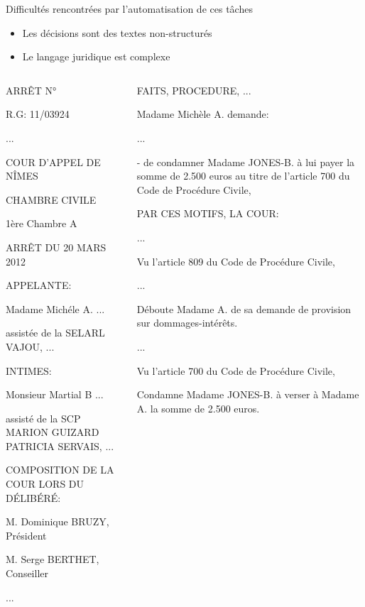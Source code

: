 \begin{frame}{Difficultés rencontrées par l'automatisation de ces tâches}
	\begin{itemize}
		\item Les décisions sont des textes non-structurés
		\item Le langage juridique est complexe
	\end{itemize}	

	\tiny	
	\begin{columns}
		\begin{column}{.50\linewidth}
			ARRÊT N°
			
			R.G: 11/03924
			
			...
			
			{COUR D'APPEL} DE {NÎMES}
			
			{CHAMBRE CIVILE}
			
			{1ère Chambre A}
			
			ARRÊT DU {20 MARS 2012}
			
			APPELANTE:
			
			{Madame Michéle A.} ...
			
			assistée de la {SELARL VAJOU}, ...
			
			INTIMES:
			
			{Monsieur Martial B} ...
			
			assisté de la {SCP MARION GUIZARD PATRICIA SERVAIS}, ...
			
			COMPOSITION DE LA COUR LORS DU DÉLIBÉRÉ:
			
			{M. Dominique BRUZY, Président}
			
			{M. Serge BERTHET, Conseiller}
			
			...
		\end{column}
		\begin{column}{.50\linewidth}
			FAITS, PROCEDURE, ...
			
			Madame Michèle A. demande:
			
			...
			
			- de condamner Madame JONES-B. à lui payer la somme de {2.500 euros} au titre de l'{article 700 du Code de Procédure Civile}, 
			
			\vspace{0.4cm}
			
			PAR CES MOTIFS, LA COUR:
			
			...
			
			Vu l'{article 809 du Code de Procédure Civile},
			
			...
			
			{Déboute Madame A. de sa demande de provision sur dommages-intérêts.}
			
			...
			
			Vu l'{article 700 du Code de Procédure Civile},
			
			Condamne Madame JONES-B. à verser à Madame A. la somme de {2.500 euros}.
		\end{column}
	\end{columns}
\end{frame}